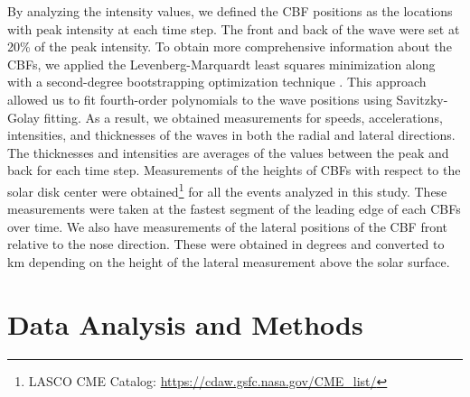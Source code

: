 By analyzing the intensity values, we defined the CBF positions as the locations with peak intensity at each time step. The front and back of the wave were set at 20\% of the peak intensity.
To obtain more comprehensive information about the CBFs, we applied the Levenberg-Marquardt least squares minimization \citep{markwardt_2009} along with a second-degree bootstrapping optimization technique \citep{efron_1979}. This approach allowed us to fit fourth-order polynomials to the wave positions using Savitzky-Golay fitting. As a result, we obtained measurements for speeds, accelerations, intensities, and thicknesses of the waves in both the radial and lateral directions. The thicknesses and intensities are averages of the values between the peak and back for each time step. Measurements of the heights of CBFs with respect to the solar disk center were obtained\footnote{LASCO CME Catalog: \url{https://cdaw.gsfc.nasa.gov/CME_list/}} for all the events analyzed in this study. These measurements were taken at the fastest segment of the leading edge of each CBFs over time.
We also have measurements of the lateral positions of the CBF front relative to the nose direction. These were obtained in degrees and converted to km depending on the height of the lateral measurement above the solar surface.

\section{Data Analysis and Methods}


